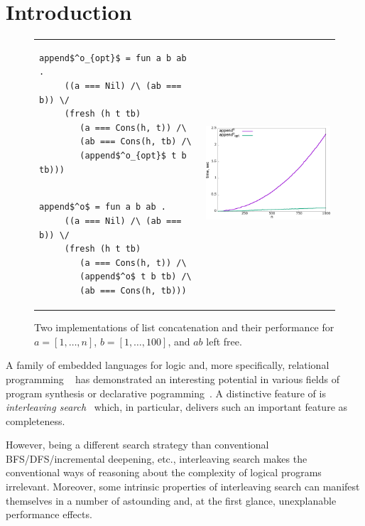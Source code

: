 \section{Introduction}
\label{sec:intro}

\begin{figure}[t]
\begin{tabular}{p{6cm}p{6cm}}
\begin{lstlisting}[basicstyle=\small]
   append$^o_{opt}$ = fun a b ab .
     ((a === Nil) /\ (ab === b)) \/
     (fresh (h t tb)
        (a === Cons(h, t)) /\
        (ab === Cons(h, tb) /\
        (append$^o_{opt}$ t b tb)))
\end{lstlisting} & \multirow{2}{*}[-3mm]{\includegraphics[width=6cm,height=5cm]{append_without_oc.png}} \\[-9mm]
\begin{lstlisting}[basicstyle=\small]
   append$^o$ = fun a b ab .
     ((a === Nil) /\ (ab === b)) \/
     (fresh (h t tb)
        (a === Cons(h, t)) /\
        (append$^o$ t b tb) /\
        (ab === Cons(h, tb)))
\end{lstlisting} &
\end{tabular}
\caption{Two implementations of list concatenation and their performance for $a = [1,\dots,n]$, $b = [1,\dots,100]$, and $ab$ left free.}
\label{fig:length_implementations}
\end{figure}

A family of embedded languages for logic and, more specifically, relational programming \mK~\cite{TRS} has demonstrated an interesting potential in various fields of 
program synthesis or declarative pogramming~\cite{SevenProblems,Twines,Matching}. A distinctive feature of \mK is \emph{interleaving search}~\cite{Transformers} which,
in particular, delivers such an important feature as completeness.

However, being a different search strategy than conventional BFS/DFS/incremental deepening, etc., interleaving search makes the conventional ways of reasoning about the complexity
of logical programs irrelevant. Moreover, some intrinsic properties of interleaving search can manifest themselves in a number of astounding and, at the first glance, unexplanable
performance effects. 

